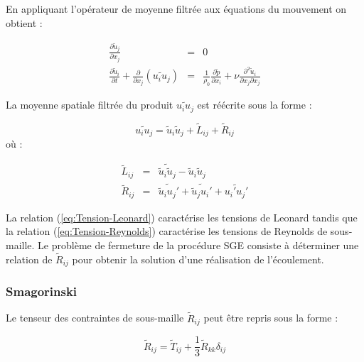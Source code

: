 En appliquant l'op\'erateur de moyenne filtr\'ee aux \'equations du mouvement
on obtient :

\begin{subequations}

\begin{eqnarray}
\frac{\partial\tilde{u}_{j}}{\partial x_{j}} & = & 0\label{eq:divu_LES}\\
\frac{\partial\tilde{u}_{i}}{\partial t}+\frac{\partial}{\partial x_{j}}(\widetilde{u_{i}u_{j}}) & = & \frac{1}{\rho_{0}}\frac{\partial\tilde{p}}{\partial x_{i}}+\nu\frac{\partial^{2}\tilde{u}_{i}}{\partial x_{j}\partial x_{j}}\label{eq:QDM_LES}
\end{eqnarray}


\end{subequations}

La moyenne spatiale filtr\'ee du produit $\widetilde{u_{i}u_{j}}$ est
r\'e\'ecrite sous la forme :

\[
\widetilde{u_{i}u_{j}}=\tilde{u}_{i}\tilde{u}_{j}+\tilde{L}_{ij}+\tilde{R}_{ij}
\]
o\`u :

\begin{subequations}

\begin{eqnarray}
\tilde{L}_{ij} & = & \widetilde{\tilde{u}_{i}\tilde{u}_{j}}-\tilde{u}_{i}\tilde{u}_{j}\label{eq:Tension-Leonard}\\
\tilde{R}_{ij} & = & \widetilde{\tilde{u}_{i}u_{j}'}+\widetilde{\tilde{u}_{j}u_{i}'}+\widetilde{u_{i}'u_{j}'}\label{eq:Tension-Reynolds}
\end{eqnarray}


\end{subequations}

La relation (\ref{eq:Tension-Leonard}) caract\'erise les tensions de
Leonard tandis que la relation (\ref{eq:Tension-Reynolds}) caract\'erise
les tensions de Reynolds de sous-maille. Le probl\`eme de fermeture
de la proc\'edure SGE consiste \`a d\'eterminer une relation de $\tilde{R}_{ij}$
pour obtenir la solution d'une r\'ealisation de l'\'ecoulement.


\subsubsection{Smagorinski}

Le tenseur des contraintes de sous-maille $\tilde{R}_{ij}$ peut \^etre
repris sous la forme :

\[
\tilde{R}_{ij}=\tilde{T}_{ij}+\frac{1}{3}\tilde{R}_{kk}\delta_{ij}
\]


